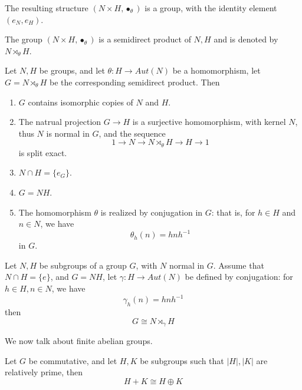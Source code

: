 \documentclass[openany]{book}
\begin{document}
\begin{lem}
    The resulting structure $(N\times H, \bullet_\theta)$ is a group, with the identity element $(e_N, e_H)$.
\end{lem}
\begin{defn}
    The group $(N\times H, \bullet_\theta)$ is a semidirect product of $N,H$ and is denoted by $N\rtimes_\theta H$.
\end{defn}
\begin{prop}
    Let $N,H$ be groups, and let $\theta:H\to Aut(N)$ be a homomorphism, let $G=N\rtimes_\theta H$ be the corresponding semidirect product. Then 
    \begin{enumerate}
        \item $G$ contains isomorphic copies of $N$ and $H$.
        \item The natrual projection $G\to H$ is a surjective homomorphism, with kernel $N$, thus $N$ is normal in $G$, and the sequence 
        \begin{equation*}
            1\to N\to N\rtimes_\theta H\to H\to 1
        \end{equation*}
        is split exact.
        \item $N\cap H=\{e_G\}$.
        \item $G=NH$.
        \item The homomorphism $\theta$ is realized by conjugation in $G$: that is, for $h\in H$ and $n\in N$, we have
        \begin{equation*}
            \theta_h(n)=hnh^{-1}
        \end{equation*}
        in $G$.
    \end{enumerate}
\end{prop}
\begin{prop}
    Let $N,H$ be subgroups of a group $G$, with $N$ normal in $G$. Assume that $N\cap H=\{e\}$, and $G=NH$, let $\gamma:H\to Aut(N)$ be defined by conjugation: for $h\in H, n\in N$, we have 
    \begin{equation*}
        \gamma_h(n)=hnh^{-1}
    \end{equation*}
    then 
    \begin{equation*}
        G\cong N\rtimes_\gamma H
    \end{equation*}
\end{prop}
We now talk about finite abelian groups.
\begin{lem}
    Let $G$ be commutative, and let $H,K$ be subgroups such that $|H|,|K|$ are relatively prime, then 
    \begin{equation*}
        H+K\cong H\oplus K
    \end{equation*}
\end{lem}
\end{document}

